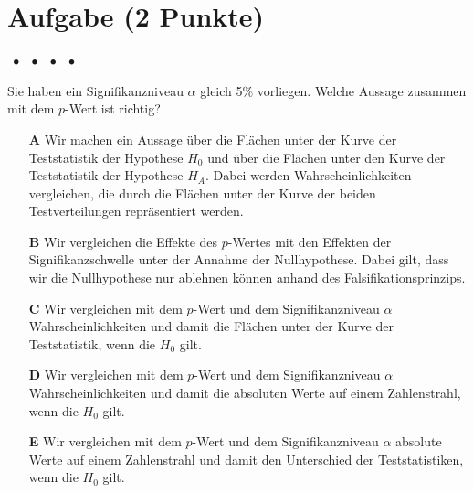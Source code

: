 \documentclass[a4paper, 9pt]{scrartcl}\usepackage[]{graphicx}\usepackage[]{xcolor}
\begin{document}

\section{Aufgabe \hfill (2 Punkte)}

\ifcollection
\begin{flushright}
\tiny\vspace{-2Ex}
\textbf{\examinhaltstart}
\exammodulemathstat $\;\bullet$
\exammodulestat $\;\bullet$
\exammodulestatbbv $\;\bullet$
\exammodulestatversuch $\;\bullet$
\exammodulebiostat
\vspace{-1Ex}
\end{flushright}
\fi




Sie haben ein Signifikanzniveau $\alpha$ gleich 5\% vorliegen. Welche Aussage zusammen mit dem $p$-Wert ist richtig?



\begin{enumerate}
\item [\textbf{A} \msquare] Wir machen ein Aussage über die Flächen unter der Kurve der Teststatistik der Hypothese $H_0$ und über die Flächen unter den Kurve der Teststatistik der Hypothese $H_A$. Dabei werden Wahrscheinlichkeiten vergleichen, die durch die Flächen unter der Kurve der beiden Testverteilungen repräsentiert werden.
\item [\textbf{B} \msquare] Wir vergleichen die Effekte des $p$-Wertes mit den Effekten der Signifikanzschwelle unter der Annahme der Nullhypothese. Dabei gilt, dass wir die Nullhypothese nur ablehnen können anhand des Falsifikationsprinzips.
\item [\textbf{C} \msquare] Wir vergleichen mit dem $p$-Wert und dem Signifikanzniveau $\alpha$ Wahrscheinlichkeiten und damit die Flächen unter der Kurve der Teststatistik, wenn die $H_0$ gilt.
\item [\textbf{D} \msquare] Wir vergleichen mit dem $p$-Wert und dem Signifikanzniveau $\alpha$ Wahrscheinlichkeiten und damit die absoluten Werte auf einem Zahlenstrahl, wenn die $H_0$ gilt.
\item [\textbf{E} \msquare] Wir vergleichen mit dem $p$-Wert und dem Signifikanzniveau $\alpha$ absolute Werte auf einem Zahlenstrahl und damit den Unterschied der Teststatistiken, wenn die $H_0$ gilt.
\end{enumerate}
\end{document}
